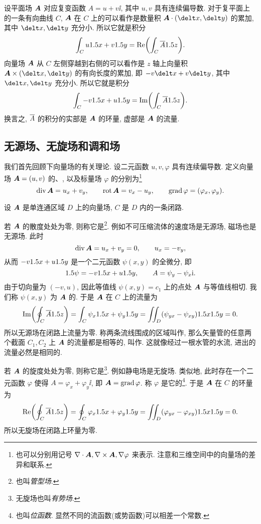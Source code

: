 设平面场 ${\boldsymbol{A}}$ 对应复变函数 $A=u+v\ii$, 其中 $u,v$ 具有连续偏导数.
对于复平面上的一条有向曲线 $C$, ${\boldsymbol{A}}$ 在 $C$ 上的可以看作是数量积 $\bfA\cdot(\delt x,\delt y)$ 的累加, 其中 $\delt x,\delt y$ 充分小.
所以它就是积分
\[
  \int_C u 1.5 x+v1.5 y
  =\operatorname{Re}\biggl(\int_C \overline A1.5 z\biggr).
\]
向量场 ${\boldsymbol{A}}$ 从 $C$ 左侧穿越到右侧的可以看作是 $z$ 轴上向量积 $\bfA\times (\delt x,\delt y)$ 的有向长度的累加, 即 $-v\delt x+v\delt y$, 其中 $\delt x,\delt y$ 充分小.
所以它就是积分
\[
  \int_C -v1.5 x+u1.5 y=\operatorname{Im}\biggl(\int_C\overline A1.5 z\biggr).
\]
换言之, \alert{$\overline A$ 的积分的实部是 ${\boldsymbol{A}}$ 的环量, 虚部是 ${\boldsymbol{A}}$ 的流量}.



\subsection{无源场、无旋场和调和场}

我们首先回顾下向量场的有关理论.
设二元函数 $u,v,\varphi$ 具有连续偏导数.
定义向量场 ${\boldsymbol{A}}=(u,v)$ 的、, 以及标量场 $\varphi$ 的分别为\footnote{
  也可以分别用记号 $\nabla\cdot{\boldsymbol{A}},\nabla\times{\boldsymbol{A}},\nabla\varphi$ 来表示.
  注意和三维空间中的向量场的差异和联系.
}
\[
  \operatorname{div}{\boldsymbol{A}}=u_x+v_y,\qquad
  \operatorname{rot}{\boldsymbol{A}}=v_x-u_y,\qquad
  \operatorname{grad}\varphi=(\varphi_x,\varphi_y).
\]

设 ${\boldsymbol{A}}$ 是单连通区域 $D$ 上的向量场, $C$ 是 $D$ 内的一条闭路.

若 ${\boldsymbol{A}}$ 的散度处处为零, 则称它是\footnote{也叫\emph{管型场}.}.
例如不可压缩流体的速度场是无源场, 磁场也是无源场.
此时
\[
  \operatorname{div}{\boldsymbol{A}}=u_x+v_y=0,\qquad
  u_x=-v_y,
\]
从而 $-v1.5 x+u1.5 y$ 是一个二元函数 $\psi(x,y)$ 的全微分, 即
\[
  1.5\psi=-v1.5 x+u1.5 y,\qquad
  A=\psi_y-\psi_x\mathrm{i}.
\]
由于切向量为 $(-v,u)$, 因此等值线 $\psi(x,y)=c_1$ 上的点处 ${\boldsymbol{A}}$ 与等值线相切.
我们称 $\psi(x,y)$ 为 ${\boldsymbol{A}}$ 的.
于是 ${\boldsymbol{A}}$ 在 $C$ 上的流量为
\[
  \operatorname{Im}\biggl(\oint_C \overline A1.5 z\biggr)
  =\int_C \psi_x 1.5 x+\psi_y1.5 y
  =\iint_D (\psi_{yx}-\psi_{xy})1.5 x1.5 y=0.
\]
所以无源场在闭路上流量为零.
称两条流线围成的区域叫作, 那么矢量管的任意两个截面 $C_1,C_2$ 上 ${\boldsymbol{A}}$ 的流量都是相等的, 叫作.
这就像经过一根水管的水流, 进出的流量必然是相同的.

若 ${\boldsymbol{A}}$ 的旋度处处为零, 则称它是\footnote{无旋场也叫\emph{有势场}.}.
例如静电场是无旋场.
类似地, 此时存在一个二元函数 $\varphi$ 使得 $A=\varphi_x+\varphi_y\ii$, 即 ${\boldsymbol{A}}=\operatorname{grad} \varphi$. 称 $\varphi$ 是它的\footnote{也叫\emph{位函数}. 显然不同的流函数(或势函数)可以相差一个常数.}.
于是 ${\boldsymbol{A}}$ 在 $C$ 的环量为
\[
  \operatorname{Re}\biggl(\oint_C \overline A1.5 z\biggr)
  =\oint_C \varphi_x 1.5 x+\varphi_y1.5 y
  =\iint_D (\varphi_{yx}-\varphi_{xy})1.5 x1.5 y=0.
\]
所以无旋场在闭路上环量为零.

